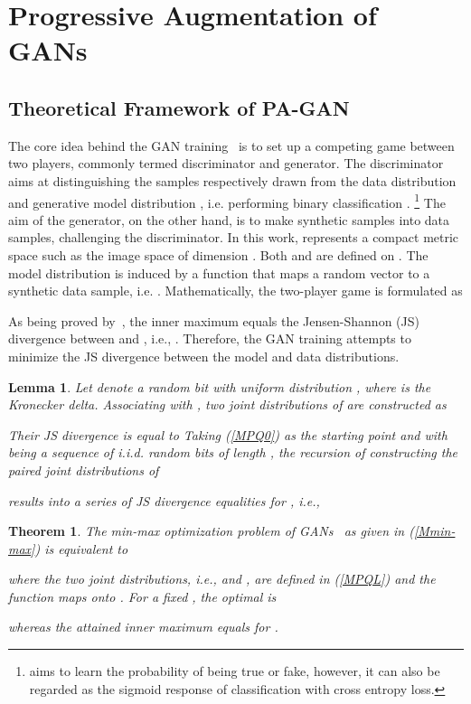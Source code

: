\documentclass{article}
\newtheorem{thm}{Theorem}
\newtheorem{lma}{Lemma}
\begin{document}
 \section{Progressive Augmentation of GANs} \label{sec:PAGAN-all}
\subsection{Theoretical Framework of PA-GAN} \label{sec:PAGAN}
The core idea behind the GAN training~\cite{goodfellow2014generative} is to set up a competing game between two players, commonly termed discriminator and generator. The discriminator aims at distinguishing the samples  respectively drawn from the data distribution  and generative model distribution , i.e. performing binary classification . 
\footnote{ aims to learn the probability of  being true or fake, however, it can also be regarded as the sigmoid response of classification with cross entropy loss.} 
The aim of the generator, on the other hand, is to make synthetic samples into data samples, challenging the discriminator. In this work,  represents a compact metric space such as the image space  of dimension . Both  and  are defined on . The model distribution  is induced by a function  that maps a random vector  to a synthetic data sample, i.e. . Mathematically, the two-player game is formulated as

As being proved by~\cite{goodfellow2014generative}, the inner maximum equals the Jensen-Shannon (JS) divergence between  and , i.e., . Therefore, the GAN training attempts to minimize the JS divergence between the model and data distributions.



\begin{lma}\label{Mlma1}
Let  denote a random bit with uniform distribution , where  is the Kronecker delta. Associating  with , two joint distributions of  are constructed as 

Their JS divergence is equal to 
Taking (\ref{MPQ0}) as the starting point and with  being a sequence of i.i.d. random bits of length , the recursion of constructing the paired joint distributions of  

results into a series of JS divergence equalities for , i.e.,

\end{lma}


\begin{thm}\label{Mthm}
The min-max optimization problem of GANs~\cite{goodfellow2014generative} as given in (\ref{Mmin-max}) is equivalent to

where the two joint distributions, i.e.,  and , are defined in (\ref{MPQL}) and the function  maps  onto . For a fixed , the optimal  is

whereas the attained inner maximum equals  for .
\end{thm}
\end{document}
